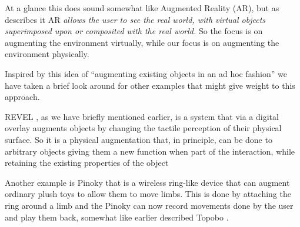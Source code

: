 At a glance this does sound somewhat like Augmented Reality (AR), but as \citet{azuma1997survey} describes it AR \emph{allows the user to see the real world, with virtual objects superimposed upon or composited with the real world.}
So the focus is on augmenting the environment virtually, while our focus is on augmenting the environment physically.


Inspired by this idea of ``augmenting existing objects in an ad hoc fashion'' we have taken a brief look around for other examples that might give weight to this approach.


REVEL \citep{bau2013revel}, as we have briefly mentioned earlier, is a system that via a digital overlay augments objects by changing the tactile perception of their physical surface.
So it is a physical augmentation that, in principle, can be done to arbitrary objects giving them a new function when part of the interaction, while retaining the existing properties of the object 

Another example is Pinoky \citep{sugiura2012pinoky} that is a wireless ring-like device that can augment ordinary plush toys to allow them to move limbs.
This is done by attaching the ring around a limb and the Pinoky can now record movements done by the user and play them back, somewhat like earlier described Topobo \citep{raffle2004topobo}.

